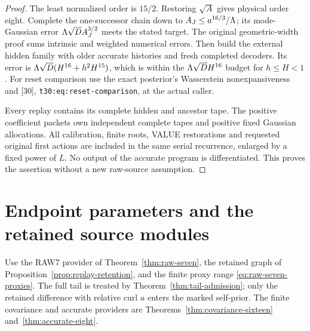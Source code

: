 \documentclass[11pt]{article}
\numberwithin{equation}{section}
\theoremstyle{remark}\newtheorem{remark}[theorem]{Remark}
\newcommand{\src}[1]{\texttt{\nolinkurl{#1}}}
\begin{document}
\begin{proof}
The least normalized order is $15/2$. Restoring $\sqrt A$ gives
physical order eight. Complete the one-successor chain down to
$A_J\le a^{16/3}/\Lambda$; its mode-Gaussian error
$\Lambda\sqrt D A_J^{3/2}$ meets the stated target. The original
geometric-width proof sums intrinsic and weighted numerical errors.
Then build the external hidden family with older accurate histories
and fresh completed decoders. Its error is
$\Lambda\sqrt D(H^{16}+h^2H^{15})$, which is within the
$\Lambda\sqrt D H^{16}$ budget for $h\le H<1$.
For reset comparison use the exact
posterior's Wasserstein nonexpansiveness and [30],
\src{t30:eq:reset-comparison}, at the actual caller.

Every replay contains its complete hidden and ancestor tape. The
positive coefficient packets own independent complete tapes and
positive fixed Gaussian allocations. All calibration, finite roots,
VALUE restorations and requested original first actions are included
in the same serial recurrence, enlarged by a fixed power of $L$.
No output of the accurate program is differentiated. This proves
the assertion without a new raw-source assumption.
\end{proof}

\section{Endpoint parameters and the retained source modules}
\label{sec:parameters}
Use the RAW7 provider of Theorem~\ref{thm:raw-seven}, the retained graph of Proposition~\ref{prop:replay-retention}, and the finite proxy range \eqref{eq:raw-seven-proxies}. The full tail is treated by Theorem~\ref{thm:tail-admission}; only the retained difference with relative curl $a$ enters the marked self-prior. The finite covariance and accurate providers are Theorems~\ref{thm:covariance-sixteen} and~\ref{thm:accurate-eight}.
\end{document}

